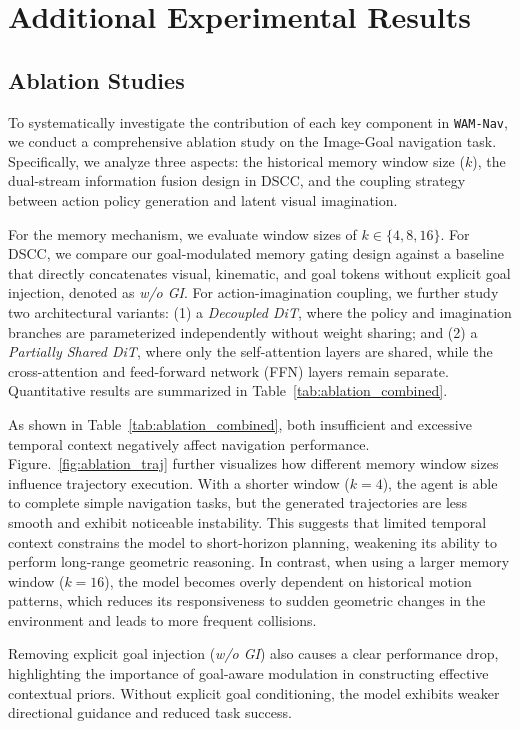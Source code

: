 \documentclass{article}
\begin{document}
\section{Additional Experimental Results}
\label{appendix:additional_results}
\subsection{Ablation Studies}

To systematically investigate the contribution of each key component in \texttt{WAM-Nav}, we conduct a comprehensive ablation study on the Image-Goal navigation task. Specifically, we analyze three aspects: the historical memory window size ($k$), the dual-stream information fusion design in DSCC, and the coupling strategy between action policy generation and latent visual imagination.

For the memory mechanism, we evaluate window sizes of $k \in \{4, 8, 16\}$. For DSCC, we compare our goal-modulated memory gating design against a baseline that directly concatenates visual, kinematic, and goal tokens without explicit goal injection, denoted as \textit{w/o GI}. For action-imagination coupling, we further study two architectural variants: (1) a \textit{Decoupled DiT}, where the policy and imagination branches are parameterized independently without weight sharing; and (2) a \textit{Partially Shared DiT}, where only the self-attention layers are shared, while the cross-attention and feed-forward network (FFN) layers remain separate. Quantitative results are summarized in Table~\ref{tab:ablation_combined}.

As shown in Table~\ref{tab:ablation_combined}, both insufficient and excessive temporal context negatively affect navigation performance. Figure.~\ref{fig:ablation_traj} further visualizes how different memory window sizes influence trajectory execution. With a shorter window ($k=4$), the agent is able to complete simple navigation tasks, but the generated trajectories are less smooth and exhibit noticeable instability. This suggests that limited temporal context constrains the model to short-horizon planning, weakening its ability to perform long-range geometric reasoning. In contrast, when using a larger memory window ($k=16$), the model becomes overly dependent on historical motion patterns, which reduces its responsiveness to sudden geometric changes in the environment and leads to more frequent collisions.

Removing explicit goal injection (\textit{w/o GI}) also causes a clear performance drop, highlighting the importance of goal-aware modulation in constructing effective contextual priors. Without explicit goal conditioning, the model exhibits weaker directional guidance and reduced task success.
\end{document}
